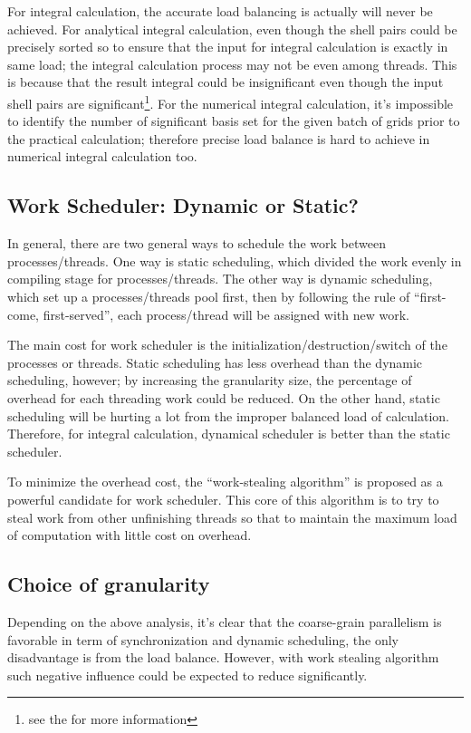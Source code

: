 For integral calculation, the accurate load balancing is actually will never be achieved. 
For analytical integral calculation, even though the shell pairs could be precisely sorted
so to ensure that the input for integral calculation is exactly in same load; the integral
calculation process may not be even among threads. This is because that the result
integral could be insignificant even though the input shell pairs are significant\footnote{see
the \label{shell_pair_para_int} for more information}. For the numerical integral calculation,
it's impossible to identify the number of significant basis set for the given batch of grids prior
to the practical calculation; therefore precise load balance is hard to achieve in numerical
integral calculation too.  

\subsection{Work Scheduler: Dynamic or Static?}
%
%
In general, there are two general ways to schedule the work between processes/threads.
One way is static scheduling, which divided the work evenly in compiling stage for 
processes/threads. The other way is dynamic scheduling, which set up a processes/threads
pool first, then by following the rule of ``first-come, first-served'', each 
process/thread will be assigned with new work.

The main cost for work scheduler is the initialization/destruction/switch of the processes or 
threads. Static scheduling has less overhead than the dynamic scheduling, however; by 
increasing the granularity size, the percentage of overhead for each threading work could be 
reduced. On the other hand, static scheduling will be hurting a lot from the improper balanced
load of calculation. Therefore, for integral calculation, dynamical scheduler is better than
the static scheduler. 

To minimize the overhead cost, the ``work-stealing algorithm'' is proposed as a powerful 
candidate for work scheduler. This core of this algorithm is to try to steal work from other 
unfinishing threads so that to maintain the maximum load of computation with little cost 
on overhead.

\subsection{Choice of granularity}
%
%
%
Depending on the above analysis, it's clear that the coarse-grain parallelism is favorable 
in term of synchronization and dynamic scheduling, the only disadvantage is from the 
load balance. However, with work stealing algorithm such negative influence could be 
expected to reduce significantly. 

